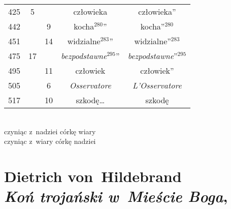 \documentclass[a4paper,11pt]{article}
\numberwithin{equation}{section}
\begin{document}
\begin{center}
\begin{tabular}{|c|c|c|c|c|}
    425 & \hphantom{0}5 & & człowieka & człowieka” \\
    442 & & \hphantom{0}9 & kocha$^{ 280 }$” & kocha”$^{ 280 }$ \\
    451 & & 14 & widzialne$^{ 283 }$” & widzialne”$^{ 283 }$ \\
    475 & 17 & & \textit{bezpodstawne}$^{ 295 }$”
           & \textit{bezpodstawne}”$^{ 295 }$ \\
    495 & & 11 & człowiek & człowiek” \\
    505 & & \hphantom{0}6 & \textit{Osservatore} & \textit{L'Osservatore} \\
    517 & & 10 & szkodę\ldots & szkodę \\
    \hline
  \end{tabular}

\end{center}

\VerSpaceTwo


\noindent
{} \\
\Jest czyniąc z~nadziei córkę wiary \\
\PowinnoByc czyniąc z~wiary córkę nadziei \\











\section{ %
  Dietrich von~Hildebrand \\
  \textit{Koń trojański w~Mieście Boga},
  \parencite{HildebrandKonTrojanski2006}}



\end{document}
